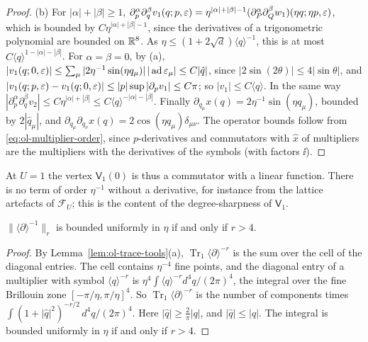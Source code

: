 \begin{proof}
(b) For $|\alpha|+|\beta|\ge1$, $\partial_p^\alpha\partial_q^\beta v_1(q;p,\varepsilon)=\eta^{|\alpha|+|\beta|-1}(\partial_P^\alpha\partial_Q^\beta w_1)(\eta q;\eta p,\varepsilon)$, which is bounded by $C\eta^{|\alpha|+|\beta|-1}$, since the derivatives of a trigonometric polynomial are bounded on $\mathbb R^8$. As $\eta\le(1+2\sqrt d)\langle q\rangle^{-1}$, this is at most $C\langle q\rangle^{1-|\alpha|-|\beta|}$. For $\alpha=\beta=0$, by (a), $|v_1(q;0,\varepsilon)|\le\sum_\mu|2\eta^{-1}\sin(\eta q_\mu)|\,|\operatorname{ad}\varepsilon_\mu|\le C|\hat q|$, since $|2\sin(2\theta)|\le4|\sin\theta|$, and $|v_1(q;p,\varepsilon)-v_1(q;0,\varepsilon)|\le|p|\sup|\partial_pv_1|\le C\pi$; so $|v_1|\le C\langle q\rangle$. In the same way $|\partial_p^\alpha\partial_q^\beta v_2|\le C\eta^{|\alpha|+|\beta|}\le C\langle q\rangle^{-|\alpha|-|\beta|}$. Finally $\partial_{q_\mu}x(q)=2\eta^{-1}\sin(\eta q_\mu)$, bounded by $2|\hat q_\mu|$, and $\partial_{q_\mu}\partial_{q_\nu}x(q)=2\cos(\eta q_\mu)\delta_{\mu\nu}$. The operator bounds follow from \eqref{eq:ol-multiplier-order}, since $p$-derivatives and commutators with $\hat x$ of multipliers are the multipliers with the derivatives of the symbols (with factors $\ii$).
\end{proof}

At $U=1$ the vertex $\mathsf V_1(0)$ is thus a commutator with a linear function. There is no term of order $\eta^{-1}$ without a derivative, for instance from the lattice artefacts of $\mathcal F_U$; this is the content of the degree-sharpness of $\mathsf V_1$.

\begin{lemma}[Integrability]\label{lem:ol-integrability}
$\|\langle\partial\rangle^{-1}\|_r$ is bounded uniformly in $\eta$ if and only if $r>4$.
\end{lemma}

\begin{proof}
By Lemma~\ref{lem:ol-trace-tools}(a), $\operatorname{Tr}_1\langle\partial\rangle^{-r}$ is the sum over the cell of the diagonal entries. The cell contains $\eta^{-4}$ fine points, and the diagonal entry of a multiplier with symbol $\langle q\rangle^{-r}$ is $\eta^4\int\langle q\rangle^{-r}d^4q/(2\pi)^4$, the integral over the fine Brillouin zone $[-\pi/\eta,\pi/\eta]^4$. So $\operatorname{Tr}_1\langle\partial\rangle^{-r}$ is the number of components times $\int(1+|\hat q|^2)^{-r/2}\,d^4q/(2\pi)^4$. Here $|\hat q|\ge\frac2\pi|q|$, and $|\hat q|\le|q|$. The integral is bounded uniformly in $\eta$ if and only if $r>4$.
\end{proof}

